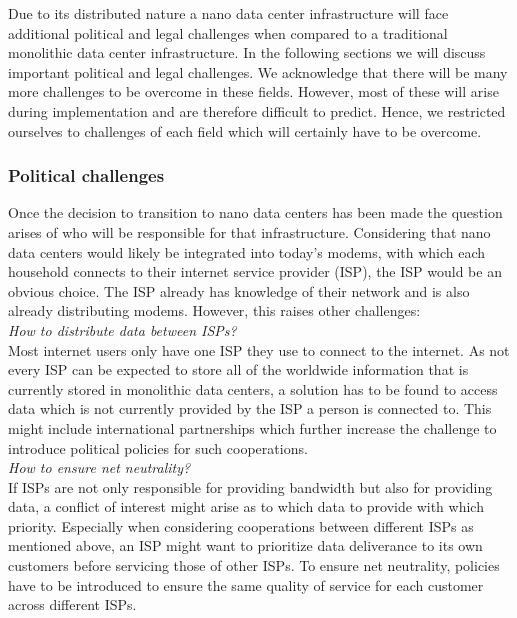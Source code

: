 Due to its distributed nature a nano data center infrastructure will face additional political and legal challenges when compared to a traditional monolithic data center infrastructure. In the following sections we will discuss important political and legal challenges. We acknowledge that there will be many more challenges to be overcome in these fields. However, most of these will arise during implementation and are therefore difficult to predict. Hence, we restricted ourselves to challenges of each field which will certainly have to be overcome.

\subsubsection{Political challenges}
Once the decision to transition to nano data centers has been made the question arises of who will be responsible for that infrastructure. Considering that nano data centers would likely be integrated into today's modems, with which each household connects to their internet service provider (ISP), the ISP would be an obvious choice. The ISP already has knowledge of their network and is also already distributing modems. However, this raises other challenges:\\

\textit{How to distribute data between ISPs?}\\
Most internet users only have one ISP they use to connect to the internet. As not every ISP can be expected to store all of the worldwide information that is currently stored in monolithic data centers, a solution has to be found to access data which is not currently provided by the ISP a person is connected to. This might include international partnerships which further increase the challenge to introduce political policies for such cooperations.\\

\textit{How to ensure net neutrality?}\\
If ISPs are not only responsible for providing bandwidth but also for providing data, a conflict of interest might arise as to which data to provide with which priority. Especially when considering cooperations between different ISPs as mentioned above, an ISP might want to prioritize data deliverance to its own customers before servicing those of other ISPs. To ensure net neutrality, policies have to be introduced to ensure the same quality of service for each customer across different ISPs.\\

